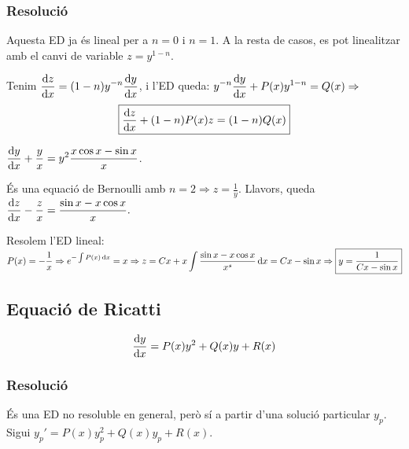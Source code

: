 \subsubsection*{Resolució}
Aquesta ED ja és lineal per a $n = 0$ i $n = 1$. A la resta de casos, es pot linealitzar amb el canvi de variable $\boxed{z = y^{1-n}}$.

Tenim $\displaystyle \frac{\mathrm{d} z}{\mathrm{d} x} = (1-n) y^{-n} \frac{\mathrm{d} y}{\mathrm{d} x}$, i l'ED queda: $\displaystyle y^{-n} \frac{\mathrm{d} y}{\mathrm{d} x} + P(x) y^{1-n} = Q(x) \Rightarrow$
\begin{align}
    \boxed{\frac{\mathrm{d} z}{\mathrm{d} x} + (1-n) P(x) z = (1-n) Q(x)}
\end{align}
\begin{example}
	$\displaystyle \frac{\mathrm{d} y}{\mathrm{d} x} + \frac{y}{x} = y^{2} \frac{x \cos x - \sin x}{x}$.

	És una equació de Bernoulli amb $\displaystyle n = 2 \Rightarrow z = \frac{1}{y}$. Llavors, queda $\displaystyle \frac{\mathrm{d} z}{\mathrm{d} x} - \frac{z}{x} = \frac{\sin x - x \cos x}{x}.$

	Resolem l'ED lineal: $\displaystyle P(x) = - \frac{1}{x} \Rightarrow e^{- \int P(x) \mathop{}\!\mathrm{d} x} = x \Rightarrow z = Cx + x \int \frac{\sin x - x \cos x}{x^{s}} \mathop{}\!\mathrm{d} x = Cx - \sin x \Rightarrow \boxed{y = \frac{1}{Cx - \sin x}}$
\end{example}

\subsection{Equació de Ricatti}
\begin{defi}
	\begin{align}
		\frac{\mathrm{d} y}{\mathrm{d} x} = P(x) y^{2} + Q(x) y + R(x)
	\end{align}
\end{defi}
\subsubsection*{Resolució}
És una ED no resoluble en general, però sí a partir d'una solució particular $y_{p}$. Sigui $\displaystyle y_{p}' = P(x) y^{2}_{p} + Q(x) y_{p} + R(x)$.

